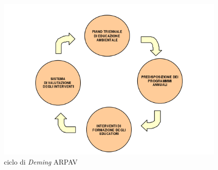 \begin{figure}[htbp]
\includegraphics[scale=0.7]{./capitoli/capitolo1/img/pdca}
	\caption{ciclo di \textit{Deming} ARPAV}
\end{figure}
